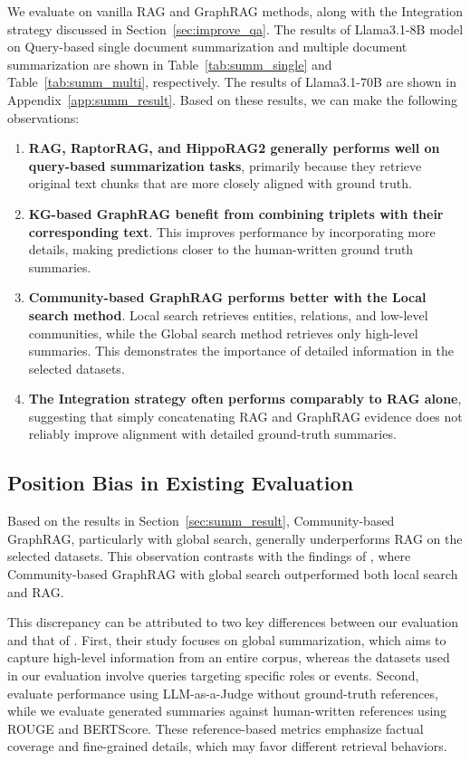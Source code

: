 We evaluate on vanilla RAG and GraphRAG methods, along with the Integration strategy discussed in Section~\ref{sec:improve_qa}. 
The results of Llama3.1-8B model on Query-based single document summarization and multiple document summarization are shown in Table~\ref{tab:summ_single} and Table~\ref{tab:summ_multi}, respectively. The results of Llama3.1-70B are shown in Appendix~\ref{app:summ_result}. Based on these results, we can make the following observations: 
\begin{enumerate}[leftmargin=*, itemsep=0pt, parsep=-1pt]
    \item {\bf RAG, RaptorRAG, and HippoRAG2 generally performs well on query-based summarization tasks}, primarily because they retrieve original text chunks that are more closely aligned with ground truth.
    \item {\bf KG-based GraphRAG benefit from combining triplets with their corresponding text}. This improves performance by incorporating more details, making predictions closer to the human-written ground truth summaries.
    \item {\bf Community-based GraphRAG performs better with the Local search method}. Local search retrieves entities, relations, and low-level communities, while the Global search method retrieves only high-level summaries. This demonstrates the importance of detailed information in the selected datasets.
    \item {\bf The Integration strategy often performs comparably to RAG alone}, suggesting that simply concatenating RAG and GraphRAG evidence does not reliably improve alignment with detailed ground-truth summaries.
\end{enumerate}



\subsection{Position Bias in Existing Evaluation}
\label{sec:summ_analysis}
Based on the results in Section~\ref{sec:summ_result}, Community-based GraphRAG, particularly with global search, generally underperforms RAG on the selected datasets. This observation contrasts with the findings of \citet{edge2024local}, where Community-based GraphRAG with global search outperformed both local search and RAG.

This discrepancy can be attributed to two key differences between our evaluation and that of \citet{edge2024local}. First, their study focuses on global summarization, which aims to capture high-level information from an entire corpus, whereas the datasets used in our evaluation involve queries targeting specific roles or events. Second, \citet{edge2024local} evaluate performance using LLM-as-a-Judge without ground-truth references, while we evaluate generated summaries against human-written references using ROUGE and BERTScore. These reference-based metrics emphasize factual coverage and fine-grained details, which may favor different retrieval behaviors.

